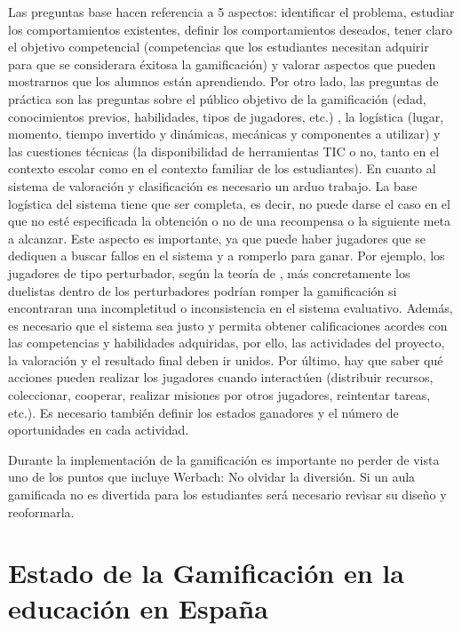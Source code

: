 \label{PasosGamificar}
%
Las preguntas base hacen referencia a 5 aspectos: identificar el problema, estudiar los comportamientos existentes, definir los comportamientos deseados, tener claro el objetivo competencial (competencias que los estudiantes necesitan adquirir para que se considerara éxitosa la gamificación) y valorar aspectos que pueden mostrarnos que los alumnos están aprendiendo.
%
Por otro lado, las preguntas de práctica son las preguntas sobre el público objetivo de la gamificación (edad, conocimientos previos, habilidades, tipos de jugadores, etc.) , la logística (lugar, momento, tiempo invertido y dinámicas, mecánicas y componentes a utilizar) y las cuestiones técnicas (la disponibilidad de herramientas TIC o no, tanto en el contexto escolar como en el contexto familiar de los estudiantes).
%
En cuanto al sistema de valoración y clasificación es necesario un arduo trabajo.
%
La base logística del sistema tiene que ser completa, es decir, no puede darse el caso en el que no esté especificada la obtención o no de una recompensa o la siguiente meta a alcanzar.
%
Este aspecto es importante, ya que puede haber jugadores que se dediquen a buscar fallos en el sistema y a romperlo para ganar.
%
Por ejemplo, los jugadores de tipo perturbador, según la teoría de  \citet{marczewski}, más concretamente los duelistas dentro de los perturbadores podrían romper la gamificación si encontraran una incompletitud o inconsistencia en el sistema evaluativo.
%
Además, es necesario que el sistema sea justo y permita obtener calificaciones acordes con las competencias y habilidades adquiridas, por ello, las actividades del proyecto, la valoración y el resultado final deben ir unidos.
%
Por último, hay que saber qué acciones pueden realizar los jugadores cuando interactúen (distribuir recursos, coleccionar, cooperar, realizar misiones por otros jugadores, reintentar tareas, etc.). 
%
Es necesario también definir los estados ganadores y el número de oportunidades en cada actividad.

Durante la implementación de la gamificación es importante no perder de vista uno de los puntos que incluye Werbach: No olvidar la diversión.
%
Si un aula gamificada no es divertida para los estudiantes será necesario revisar su diseño y reoformarla.


\section{Estado de la Gamificación en la educación en España}

